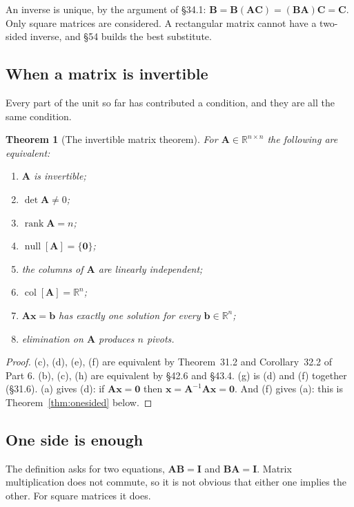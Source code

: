 \documentclass[11pt]{article}
\theoremstyle{plain}
\newtheorem{thm}{Theorem}[section]
\theoremstyle{definition}
\theoremstyle{remark}
\newcommand{\R}{\mathbb{R}}
\newcommand{\vc}[1]{\mathbf{#1}}
\newcommand{\mt}[1]{\mathbf{#1}}
\newcommand{\colsp}[1]{\operatorname{col}[#1]}
\newcommand{\nullsp}[1]{\operatorname{null}[#1]}
\DeclareMathOperator{\rank}{rank}
\begin{document}
\noindent An inverse is unique, by the argument of \S34.1:
$\mt{B}=\mt{B}(\mt{A}\mt{C})=(\mt{B}\mt{A})\mt{C}=\mt{C}$. Only square matrices
are considered. A rectangular matrix cannot have a two-sided inverse, and
\S54 builds the best substitute.

\subsection{When a matrix is invertible}
Every part of the unit so far has contributed a condition, and they are all the
same condition.

\begin{thm}[The invertible matrix theorem]
\label{thm:imt}
For $\mt{A}\in\R^{n\times n}$ the following are equivalent:
\begin{enumerate}[label=(\alph*),leftmargin=2.2em,itemsep=2pt]
  \item $\mt{A}$ is invertible;
  \item $\det\mt{A}\neq0$;
  \item $\rank\mt{A}=n$;
  \item $\nullsp{\mt{A}}=\{\vc{0}\}$;
  \item the columns of $\mt{A}$ are linearly independent;
  \item $\colsp{\mt{A}}=\R^{n}$;
  \item $\mt{A}\vc{x}=\vc{b}$ has exactly one solution for every $\vc{b}\in\R^{n}$;
  \item elimination on $\mt{A}$ produces $n$ pivots.
\end{enumerate}
\end{thm}

\begin{proof}
(c), (d), (e), (f) are equivalent by Theorem~31.2 and Corollary~32.2 of Part 6.
(b), (c), (h) are equivalent by \S42.6 and \S43.4. (g) is (d) and (f) together
(\S31.6). (a) gives (d): if $\mt{A}\vc{x}=\vc{0}$ then
$\vc{x}=\mt{A}^{-1}\mt{A}\vc{x}=\vc{0}$. And (f) gives (a): this is
Theorem~\ref{thm:onesided} below.
\end{proof}

\subsection{One side is enough}
The definition asks for two equations, $\mt{A}\mt{B}=\mt{I}$ and
$\mt{B}\mt{A}=\mt{I}$. Matrix multiplication does not commute, so it is not
obvious that either one implies the other. For square matrices it does.
\end{document}
